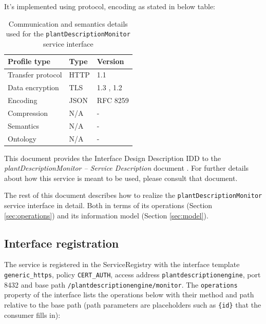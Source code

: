 \documentclass[a4paper]{arrowhead}
\begin{document}
It's implemented using protocol, encoding as stated in below table:
\begin{table}[ht!]
  \centering
  \begin{tabular}{|l|l|l|}
    \hline
    \rowcolor{gray!33} Profile type & Type & Version \\ \hline
    Transfer protocol & HTTP & 1.1 \cite{rfc9112} \\ \hline
    Data encryption & TLS & 1.3 \cite{rfc8446}, 1.2 \cite{rfc5246} \\ \hline
    Encoding & JSON & RFC 8259 \cite{rfc8259} \\ \hline
    Compression & N/A & - \\ \hline
    Semantics & N/A & - \\ \hline
    Ontology & N/A & - \\ \hline
  \end{tabular}
  \caption{Communication and semantics details used for the \texttt{plant\allowbreak{}Description\allowbreak{}Monitor} service interface}
  \label{tab:comunication_semantics_profile}
\end{table}

This document provides the Interface Design Description IDD to the \textit{plantDescriptionMonitor -- Service Description} document \cite{pde-plantDescriptionMonitor-sd}.
For further details about how this service is meant to be used, please consult that document.

The rest of this document describes how to realize the \texttt{plant\allowbreak{}Description\allowbreak{}Monitor} service
interface in detail. Both in terms of its operations (Section \ref{sec:operations}) and its information model (Section \ref{sec:model}).

\subsection{Interface registration}

The service is registered in the ServiceRegistry with the interface template \texttt{generic\_\allowbreak{}https}, policy \texttt{CERT\_\allowbreak{}AUTH}, access address \texttt{plantdescriptionengine}, port 8432 and base path \texttt{/\allowbreak{}plantdescriptionengine/\allowbreak{}monitor}. The \texttt{operations} property of the interface lists the operations below with their method and path relative to the base path (path parameters are placeholders such as \texttt{\{id\}} that the consumer fills in):
\end{document}
